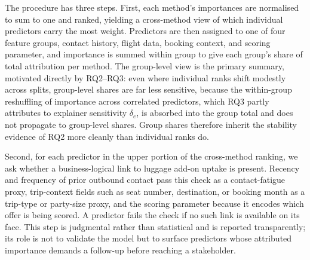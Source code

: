 \documentclass[oneside]{memoir} %
\begin{document}
The procedure has three steps. First, each method's importances are normalised to sum to one and ranked, yielding a cross-method view of which individual predictors carry the most weight. Predictors are then assigned to one of four feature groups, contact history, flight data, booking context, and scoring parameter, and importance is summed within group to give each group's share of total attribution per method. The group-level view is the primary summary, motivated directly by RQ2--RQ3: even where individual ranks shift modestly across splits, group-level shares are far less sensitive, because the within-group reshuffling of importance across correlated predictors, which RQ3 partly attributes to explainer sensitivity $\delta_e$, is absorbed into the group total and does not propagate to group-level shares. Group shares therefore inherit the stability evidence of RQ2 more cleanly than individual ranks do.

Second, for each predictor in the upper portion of the cross-method ranking, we ask whether a business-logical link to luggage add-on uptake is present. Recency and frequency of prior outbound contact pass this check as a contact-fatigue proxy, trip-context fields such as seat number, destination, or booking month as a trip-type or party-size proxy, and the scoring parameter because it encodes which offer is being scored. A predictor fails the check if no such link is available on its face. This step is judgmental rather than statistical and is reported transparently; its role is not to validate the model but to surface predictors whose attributed importance demands a follow-up before reaching a stakeholder.
\end{document}
